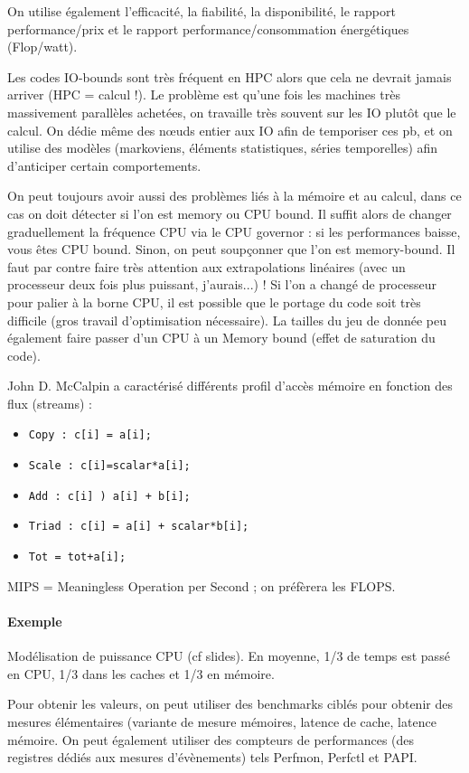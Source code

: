 \documentclass{article}
\begin{document}
On utilise également l'efficacité, la fiabilité, la disponibilité, le rapport performance/prix et le rapport performance/consommation énergétiques (Flop/watt).

Les codes IO-bounds sont très fréquent en HPC alors que cela ne devrait jamais arriver (HPC = calcul !). Le problème est qu'une fois les machines très massivement parallèles achetées, on travaille très souvent sur les IO plutôt que le calcul. On dédie même des nœuds entier aux IO afin de temporiser ces pb, et on utilise des modèles (markoviens, éléments statistiques, séries temporelles) afin d'anticiper certain comportements.


On peut toujours avoir aussi des problèmes liés à la mémoire et au calcul, dans ce cas on doit détecter si l'on est memory ou CPU bound. Il suffit alors de changer graduellement la fréquence CPU via le CPU governor : si les performances baisse, vous êtes CPU bound. Sinon, on peut soupçonner que l'on est memory-bound. Il faut par contre faire très attention aux extrapolations linéaires (avec un processeur deux fois plus puissant, j'aurais...) ! Si l'on a changé de processeur pour palier à la borne CPU, il est possible que le portage du code soit très difficile (gros travail d'optimisation nécessaire). La tailles du jeu de donnée peu également faire passer d'un CPU à un Memory bound (effet de saturation du code).
\bigskip

John D. McCalpin a caractérisé différents profil d'accès mémoire en fonction des flux (streams) :
\begin{itemize}
\item \texttt{Copy :  c[i] = a[i];}
\item \texttt{Scale : c[i]=scalar*a[i];}
\item \texttt{Add : c[i] ) a[i] + b[i];}
\item \texttt{Triad : c[i] = a[i] + scalar*b[i];}
\item \texttt{Tot = tot+a[i];}
\end{itemize}

MIPS = Meaningless Operation per Second ; on préfèrera les FLOPS.

\paragraph{Exemple} Modélisation de puissance CPU (cf slides). En moyenne, 1/3 de temps est passé en CPU, 1/3 dans les caches et 1/3 en mémoire.

Pour obtenir les valeurs, on peut utiliser des benchmarks ciblés pour obtenir des mesures élémentaires (variante de mesure mémoires, latence de cache, latence mémoire. On peut également utiliser des compteurs de performances (des registres dédiés aux mesures d'évènements) tels Perfmon, Perfctl et PAPI.
\end{document}

